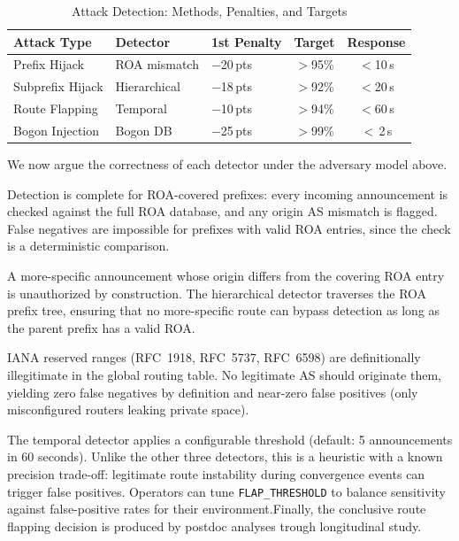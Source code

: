 \begin{table}[t]
\centering
\caption{Attack Detection: Methods, Penalties, and Targets}
\label{tab:attack_detection_mechanisms}
\setlength{\tabcolsep}{5pt}
\begin{tabular}{lllcc}
\toprule
\textbf{Attack Type} & \textbf{Detector} & \textbf{1st Penalty} & \textbf{Target} & \textbf{Response} \\
\midrule
Prefix Hijack    & ROA mismatch  & $-$20\,pts & $>$95\% & $<$10\,s \\
Subprefix Hijack & Hierarchical  & $-$18\,pts & $>$92\% & $<$20\,s \\
Route Flapping   & Temporal      & $-$10\,pts & $>$94\% & $<$60\,s \\
Bogon Injection  & Bogon DB      & $-$25\,pts & $>$99\% & $<$\,2\,s \\
\bottomrule
\end{tabular}
\end{table}

We now argue the correctness of each detector under the adversary model above.

Detection is complete for ROA-covered prefixes: every incoming announcement is checked against the full ROA database, and any origin AS mismatch is flagged. False negatives are impossible for prefixes with valid ROA entries, since the check is a deterministic comparison.

A more-specific announcement whose origin differs from the covering ROA entry is unauthorized by construction. The hierarchical detector traverses the ROA prefix tree, ensuring that no more-specific route can bypass detection as long as the parent prefix has a valid ROA.

IANA reserved ranges (RFC~1918, RFC~5737, RFC~6598) are definitionally illegitimate in the global routing table. No legitimate AS should originate them, yielding zero false negatives by definition and near-zero false positives (only misconfigured routers leaking private space).

The temporal detector applies a configurable threshold (default: 5 announcements in 60 seconds). Unlike the other three detectors, this is a heuristic with a known precision trade-off: legitimate route instability during convergence events can trigger false positives. Operators can tune \texttt{FLAP\_THRESHOLD} to balance sensitivity against false-positive rates for their environment.Finally, the conclusive route flapping decision is produced by postdoc analyses trough longitudinal study.

